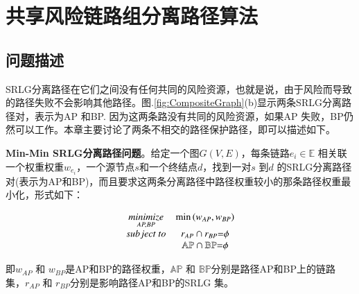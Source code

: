 \chapter{共享风险链路组分离路径算法}

\section{问题描述}
SRLG分离路径在它们之间没有任何共同的风险资源，也就是说，由于风险而导致的路径失败不会影响其他路径。图.\ref{fig:CompositeGraph}(b)显示两条SRLG分离路径对，表示为AP 和BP. 因为这两条路没有共同的风险资源，如果AP 失败，BP仍然可以工作。本章主要讨论了两条不相交的路径保护路径，即可以描述如下。

\textbf{Min-Min SRLG分离路径问题}。给定一个图$G(V,E)$，每条链路$e_i\in \mathbb{E}$ 相关联一个权重权重$w_{e_i}$，一个源节点$s$和一个终结点$d$，找到一对$s$ 到$d$ 的SRLG分离路径对(表示为AP和BP)，而且要求这两条分离路径中路径权重较小的那条路径权重最小化，形式如下：

\begin{equation}
\begin{array}{*{20}{c}}
   {\mathop {minimize}\limits_{AP,BP} } & {\min \left( {{w_{AP}},{w_{BP}}} \right)}  \\
   {subject\ to} & {{r_{AP}} \cap {r_{BP}}{\rm{ = }}\phi }  \\
   {} & {\mathbb{AP} \cap \mathbb{BP}{\rm{ = }}\phi }  \\
\end{array}
\label{eq:problem definition}
\end{equation}

即${w_{AP}}$ 和 ${w_{BP}}$是AP和BP的路径权重，$\mathbb{AP}$ 和 $\mathbb{BP}$分别是路径AP和BP上的链路集，${r_{AP}}$ 和 ${r_{BP}}$分别是影响路径AP和BP的SRLG 集。


